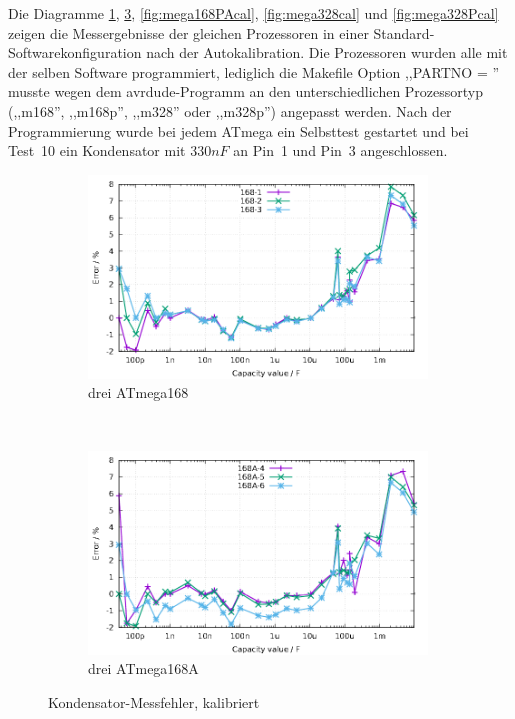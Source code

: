 Die Diagramme \ref{fig:mega168cal}, \ref{fig:mega168Acal}, \ref{fig:mega168PAcal},  \ref{fig:mega328cal} und
\ref{fig:mega328Pcal} zeigen die Messergebnisse
der gleichen Prozessoren in einer Standard-Softwarekonfiguration nach der Autokalibration.
Die Prozessoren wurden alle mit der selben Software programmiert, lediglich die Makefile Option ,,PARTNO = '' musste 
wegen dem avrdude-Programm an den unterschiedlichen Prozessortyp (,,m168'', ,,m168p'', ,,m328'' oder ,,m328p'') angepasst werden.
Nach der Programmierung wurde bei jedem ATmega ein
Selbsttest gestartet und bei Test~10 ein Kondensator mit \(330nF\) an Pin~1 und Pin~3 angeschlossen.

\begin{figure}[H]
  \begin{subfigure}[b]{9cm}
    \centering
    \includegraphics[width=9cm]{../GNU/Mega168cal.pdf}
    \caption{drei ATmega168}
    \label{fig:mega168cal}
  \end{subfigure}
  ~
  \begin{subfigure}[b]{9cm}
    \centering
    \includegraphics[width=9cm]{../GNU/Mega168Acal.pdf}
    \caption{drei ATmega168A}
    \label{fig:mega168Acal}
  \end{subfigure}
  \caption{Kondensator-Messfehler, kalibriert}
\end{figure}

